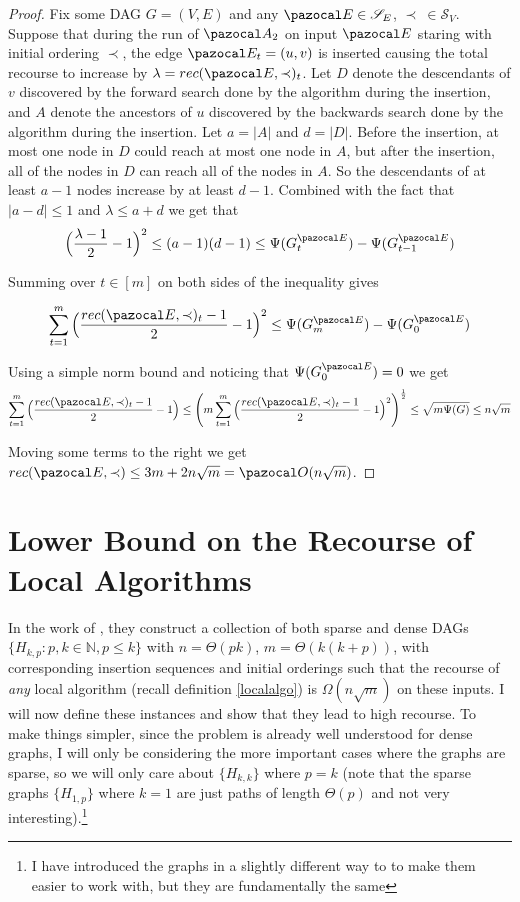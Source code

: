 \documentclass{report}
\begin{document}
\begin{proof}

Fix some DAG $G=(V,E)$ and any $\pazocal E \in \mathcal S_E$, $\prec \: \in \mathcal S_V$. Suppose that during the run of $\pazocal A_2$ on input $\pazocal E$ staring with initial ordering $\prec$, the edge $\pazocal E_t = (u,v)$ is inserted causing the total recourse to increase by $\lambda = rec(\pazocal E, \prec)_t$. Let $D$ denote the descendants of $v$ discovered by the forward search done by the algorithm during the insertion, and $A$ denote the ancestors of $u$ discovered by the backwards search done by the algorithm during the insertion. Let $a = \vert A \vert$ and $d = \vert D \vert$. Before the insertion, at most one node in $D$ could reach at most one node in $A$, but after the insertion, all of the nodes in $D$ can reach all of the nodes in $A$. So the descendants of at least $a-1$ nodes increase by at least $d - 1$. Combined with the fact that $\vert a - d \vert \leq 1$ and $\lambda \leq a + d$ we get that
\[ \Big (\frac{\lambda - 1}{2} - 1 \Big )^2 \leq (a-1)(d-1) \leq \Psi(G^{\pazocal E}_t) - \Psi(G^{\pazocal E}_{t-1}) \]

Summing over $t \in [m]$ on both sides of the inequality gives

\[ \sum_{t=1}^m \Big (\frac{rec(\pazocal E, \prec)_t - 1}{2} - 1 \Big )^2 \leq \Psi(G^{\pazocal E}_m) - \Psi(G^{\pazocal E}_{0}) \]

Using a simple norm bound and noticing that $\Psi(G_{0}^{\pazocal E})=0$ we get
\[ \sum_{t=1}^m \Big (\frac{rec(\pazocal E, \prec)_t - 1}{2} - 1 \Big ) \leq \Bigg (m \sum_{t=1}^m \Big (\frac{rec(\pazocal E, \prec)_t - 1}{2} - 1 \Big )^2 \Bigg )^{\frac{1}{2}} \leq \sqrt{m\Psi(G)} \leq n \sqrt m \]

Moving some terms to the right we get $rec(\pazocal E, \prec) \leq 3m + 2n \sqrt m = \pazocal O (n \sqrt m)$.
\end{proof}

\section{Lower Bound on the Recourse of Local Algorithms}

In the work of \cite{HaeuplerKMST12}, they construct a collection of both sparse and dense DAGs $\{ H_{k,p} : p,k \in \mathbb N, p \leq k \}$ with $n = \Theta(pk)$, $m=\Theta (k(k+p))$, with corresponding insertion sequences and initial orderings such that the recourse of \textit{any} local algorithm (recall definition \ref{localalgo}) is $\Omega(n\sqrt{m})$ on these inputs. I will now define these instances and show that they lead to high recourse. To make things simpler, since the problem is already well understood for dense graphs, I will only be considering the more important cases where the graphs are sparse, so we will only care about $\{H_{k,k}\}$ where $p=k$ (note that the sparse graphs $\{H_{1,p}\}$ where $k=1$ are just paths of length $\Theta(p)$ and not very interesting).\footnote{I have introduced the graphs in a slightly different way to \cite{HaeuplerKMST12} to make them easier to work with, but they are fundamentally the same}
\end{document}
